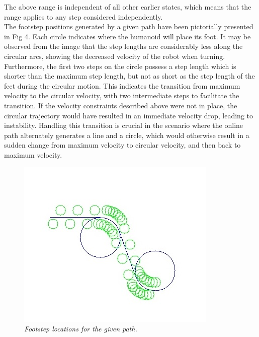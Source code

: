 \documentclass[letterpaper, 10 pt, conference]{ieeeconf}  %
\begin{document}
The above range is independent of all other earlier states, which means that the range applies to any step considered independently.\\
The footstep positions generated by a given path have been pictorially presented in Fig 4. Each circle indicates where the humanoid will place its foot. It may be observed from the image that the step lengths are considerably less along the circular arcs, showing the decreased velocity of the robot when turning. Furthermore, the first two steps on the circle possess a step length which is shorter than the maximum step length, but not as short as the step length of the feet during the circular motion. This indicates the transition from maximum velocity to the circular velocity, with two intermediate steps to facilitate the transition. If the velocity constraints described above were not in place, the circular trajectory would have resulted in an immediate velocity drop, leading to instability. Handling this transition is crucial in the scenario where the online path alternately generates a line and a circle, which would otherwise result in a sudden change from maximum velocity to circular velocity, and then back to maximum velocity.
\begin{figure}[h]  
\begin{center}  
\includegraphics[scale=01.0]{footstep.jpg}  
\caption{\small \sl Footstep locations for the given path.\label{fig:footstep}}  
\end{center}  
\end{figure}
\end{document}
